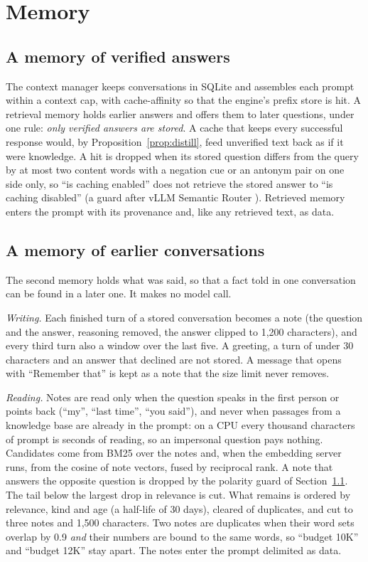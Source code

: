 \section{Memory}
\label{sec:memory}

\subsection{A memory of verified answers}
\label{sec:mem:verified}
The context manager keeps conversations in SQLite and assembles each prompt
within a context cap, with cache-affinity so that the engine's prefix store
is hit. A retrieval memory holds earlier answers and offers them to later
questions, under one rule: \emph{only verified answers are stored}. A cache
that keeps every successful response would, by
Proposition~\ref{prop:distill}, feed unverified text back as if it were
knowledge. A hit is dropped when its stored question differs from the query
by at most two content words with a negation cue or an antonym pair on one
side only, so ``is caching enabled'' does not retrieve the stored answer to
``is caching disabled'' (a guard after vLLM Semantic Router
\cite{semanticrouter2026}). Retrieved memory enters the prompt with its
provenance and, like any retrieved text, as data.

\subsection{A memory of earlier conversations}
\label{sec:mem:recall}
The second memory holds what was said, so that a fact told in one conversation
can be found in a later one. It makes no model call.

\emph{Writing.} Each finished turn of a stored conversation becomes a note
(the question and the answer, reasoning removed, the answer clipped to
1{,}200 characters), and every third turn also a window over the last five.
A greeting, a turn of under 30 characters and an answer that declined are not
stored. A message that opens with ``Remember that'' is kept as a note that
the size limit never removes.

\emph{Reading.} Notes are read only when the question speaks in the first
person or points back (``my'', ``last time'', ``you said''), and never when
passages from a knowledge base are already in the prompt: on a CPU every
thousand characters of prompt is seconds of reading, so an impersonal question
pays nothing. Candidates come from BM25 over the notes and, when the
embedding server runs, from the cosine of note vectors, fused by reciprocal
rank. A note that answers the opposite question is dropped by the polarity
guard of Section~\ref{sec:mem:verified}. The tail below the largest drop in
relevance is cut. What remains is ordered by relevance, kind and age (a
half-life of 30 days), cleared of duplicates, and cut to three notes and
1{,}500 characters. Two notes are duplicates when their word sets overlap by
0.9 \emph{and} their numbers are bound to the same words, so ``budget 10K''
and ``budget 12K'' stay apart. The notes enter the prompt delimited as data.

